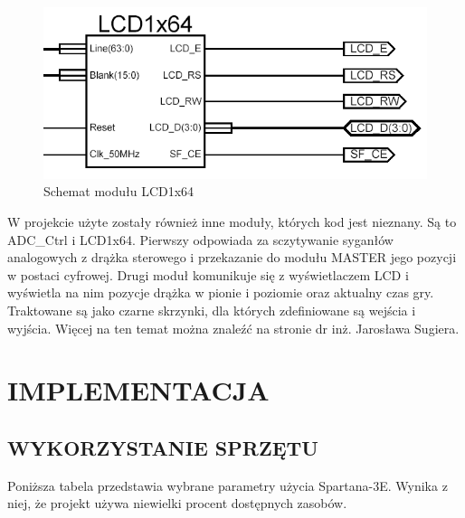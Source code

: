 \documentclass[11pt]{article}
\begin{document}
\begin{figure}[H]
\centering
\includegraphics[scale=.5]{LCD1x64.PNG}
\caption{Schemat modułu LCD1x64}
\end{figure}

W projekcie użyte zostały również inne moduły, których kod jest nieznany.
Są to ADC\_Ctrl i LCD1x64.
Pierwszy odpowiada za sczytywanie syganłów analogowych z drążka sterowego i przekazanie do modułu MASTER jego pozycji w postaci cyfrowej.
Drugi moduł komunikuje się z wyświetlaczem LCD i wyświetla na nim pozycje drążka w pionie i poziomie oraz aktualny czas gry.
Traktowane są jako czarne skrzynki, dla których zdefiniowane są wejścia i wyjścia.
Więcej na ten temat można znaleźć na stronie dr inż. Jarosława Sugiera\cite{pb}.
\newpage

\section{IMPLEMENTACJA}

\subsection{WYKORZYSTANIE SPRZĘTU}

Poniższa tabela przedstawia wybrane parametry użycia Spartana-3E.
Wynika z niej, że projekt używa niewielki procent dostępnych zasobów.
\end{document}
